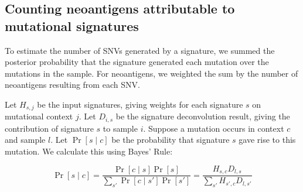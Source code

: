 \subsection*{Counting neoantigens attributable to mutational signatures}
To estimate the number of SNVs generated by a signature, we summed the posterior probability that the signature generated each mutation over the mutations in the sample. For neoantigens, we weighted the sum by the number of neoantigens resulting from each SNV.

Let $H_{s,j}$ be the input signatures, giving weights for each signature $s$ on mutational context $j$. Let $D_{i,s}$ be the signature deconvolution result, giving the contribution of signature $s$ to sample $i$. Suppose a mutation occurs in context $c$ and sample $l$. Let $\Pr[s \mid c]$ be the probability that signature $s$ gave rise to this mutation. We calculate this using Bayes' Rule:

\[
\Pr[s \mid c] = \frac{\Pr[c \mid s] \Pr[s]}{\sum_{s'}{\Pr[c \mid s']\Pr[s']}} = \frac{H_{s,c} D_{l,s}}{\sum_{s'}{H_{s',c} D_{l,s'}}}
\]

